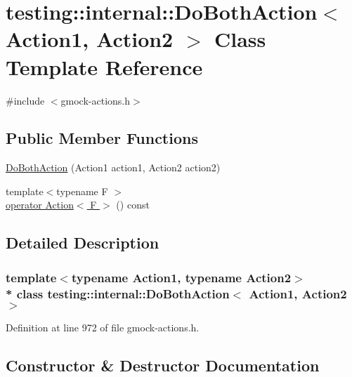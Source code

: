 \hypertarget{classtesting_1_1internal_1_1_do_both_action}{}\section{testing\+:\+:internal\+:\+:Do\+Both\+Action$<$ Action1, Action2 $>$ Class Template Reference}
\label{classtesting_1_1internal_1_1_do_both_action}


{\ttfamily \#include $<$gmock-\/actions.\+h$>$}

\subsection*{Public Member Functions}
\begin{DoxyCompactItemize}
\item 
\hyperlink{classtesting_1_1internal_1_1_do_both_action_a55727c4dbdc1816ba6f1fe124e96088b}{Do\+Both\+Action} (Action1 action1, Action2 action2)
\item 
{\footnotesize template$<$typename F $>$ }\\\hyperlink{classtesting_1_1internal_1_1_do_both_action_a5e416375c3d61b268d27cf594c135344}{operator Action$<$ F $>$} () const 
\end{DoxyCompactItemize}


\subsection{Detailed Description}
\subsubsection*{template$<$typename Action1, typename Action2$>$\\*
class testing\+::internal\+::\+Do\+Both\+Action$<$ Action1, Action2 $>$}



Definition at line 972 of file gmock-\/actions.\+h.



\subsection{Constructor \& Destructor Documentation}
